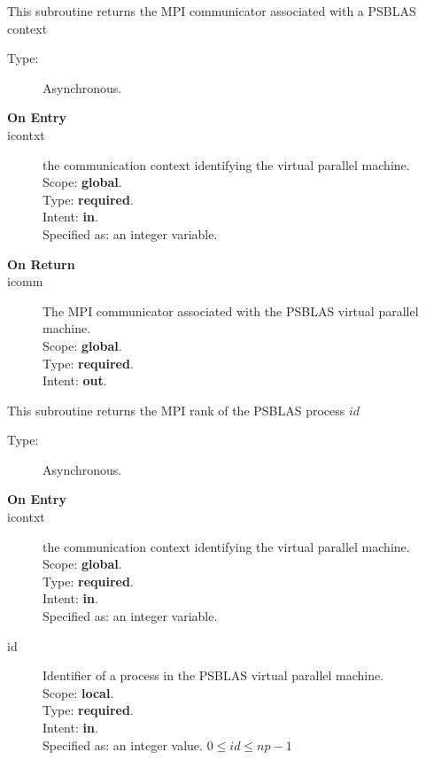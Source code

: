 

This subroutine returns the MPI communicator associated with a PSBLAS context
\begin{description}
\item[Type:] Asynchronous.
\item[\bf  On Entry ]
\item[icontxt] the communication context identifying the virtual
  parallel machine.\\
Scope: {\bf global}.\\
Type: {\bf required}.\\
Intent: {\bf in}.\\
Specified as: an integer variable.
\end{description}

\begin{description}
\item[\bf On Return]
\item[icomm] The MPI communicator associated with the  PSBLAS virtual parallel machine.\\
Scope: {\bf global}.\\
Type: {\bf required}.\\
Intent: {\bf out}.\\
\end{description}




This subroutine returns the MPI rank of the  PSBLAS process $id$
\begin{description}
\item[Type:] Asynchronous.
\item[\bf  On Entry ]
\item[icontxt] the communication context identifying the virtual
  parallel machine.\\
Scope: {\bf global}.\\
Type: {\bf required}.\\
Intent: {\bf in}.\\
Specified as: an integer variable.
\item[id] Identifier of a   process in the PSBLAS virtual parallel machine.\\
Scope: {\bf local}.\\
Type: {\bf required}.\\
Intent: {\bf in}.\\
Specified as: an integer value. $0 \le id \le np-1$\
\end{description}


